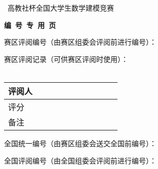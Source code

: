 \renewcommand{\baselinestretch}{1.3}\normalsize
\newpage
\thispagestyle{empty} %
{\fontsize{14pt}{\baselineskip}\selectfont \bfseries
\begin{center}{\Large\the\year}~高教社杯全国大学生数学建模竞赛\par\vspace{.5\baselineskip}\par
{\fontsize{15.75pt}{\baselineskip}\selectfont\bf 编\ 号\ 专\ 用\ 页}
\end{center}\par\vspace{1em}\par}
{%
\par\vfill
赛区评阅编号（由赛区组委会评阅前进行编号）：\par\vfill\vfill

赛区评阅记录（可供赛区评阅时使用）：\\
\\
\begin{tabular}{|l|l|l|l|l|l|l|l|l|l|l|}
\hline
\multicolumn{1}{|c|}{\parbox[t]{0.5cm}{\vspace{1ex}评阅人\vspace{1ex}}\hfill}
&\multicolumn{1}{|c|}{\hspace{30pt}\hfill}
&\multicolumn{1}{|c|}{\hspace{30pt}\hfill}
&\multicolumn{1}{|c|}{\hspace{30pt}\hfill}
&\multicolumn{1}{|c|}{\hspace{30pt}\hfill}
&\multicolumn{1}{|c|}{\hspace{30pt}\hfill}
&\multicolumn{1}{|c|}{\hspace{30pt}\hfill}
&\multicolumn{1}{|c|}{\hspace{30pt}\hfill}
&\multicolumn{1}{|c|}{\hspace{30pt}\hfill}
&\multicolumn{1}{|c|}{\hspace{30pt}\hfill}
&\multicolumn{1}{|c|}{\hspace{30pt}\hfill}\\
\hline
\parbox[t]{0.5cm}{\vspace{1ex}评分\vspace{2ex}}& & & &
& & & & & &
\\\hline
\parbox[t]{0.5cm}{\vspace{1ex}备注\vspace{2ex}}& & & & & & & & & & \\\hline
\end{tabular}
\par\vfill\vfill

全国统一编号（由赛区组委会送交全国前编号）：\par\vfill\vfill\vfill


全国评阅编号（由全国组委会评阅前进行编号）：\par\vfill\vfill\vfill
}
\renewcommand{\baselinestretch}{1.3}\normalsize
{} 